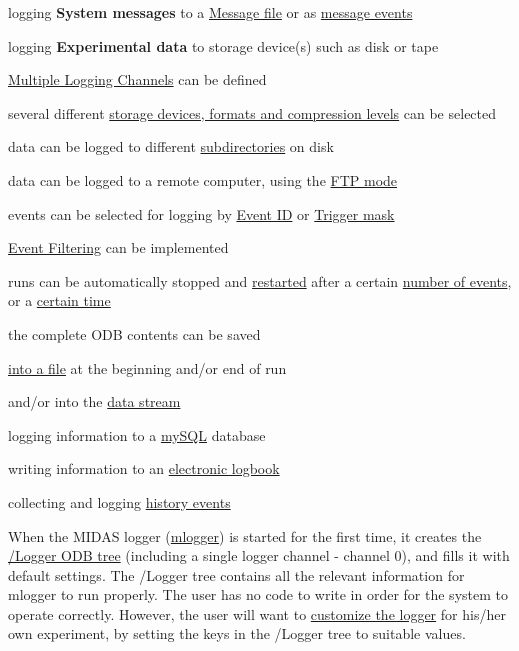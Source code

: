 \begin{DoxyItemize}
\item logging {\bfseries System messages} to a \hyperlink{F_Logging_Data_F_Logger_Message_File}{Message file} or as \hyperlink{F_Logging_Data_F_Logger_CS_Log_Messages}{message events} 
\item logging {\bfseries Experimental data } to storage device(s) such as disk or tape 
\begin{DoxyItemize}
\item \hyperlink{F_Logging_Data_F_Logger_multiple_logging_channels}{Multiple Logging Channels} can be defined 
\item several different \hyperlink{F_Logging_Data_F_Logger_CS_Filename}{storage devices, formats and compression levels} can be selected 
\item data can be logged to different \hyperlink{F_Logging_Data_F_Logger_CS_Subdir_Format}{subdirectories} on disk 
\item data can be logged to a remote computer, using the \hyperlink{F_Logging_Data_F_Logger_CS_Filename}{FTP mode} 
\item events can be selected for logging by \hyperlink{F_Logging_Data_F_Logger_CS_Event_ID}{Event ID} or \hyperlink{F_Logging_Data_F_Logger_CS_Trigger_Mask}{Trigger mask} 
\item \hyperlink{F_Logging_Data_F_Logger_Event_Filtering}{Event Filtering} can be implemented 
\item runs can be automatically stopped and \hyperlink{F_Logging_Data_F_Logger_Auto_Restart}{restarted} after a certain \hyperlink{FE_ODB_equipment_tree_FE_ODB_equipment_common}{number of events}, or a \hyperlink{F_Logging_Data_F_Logger_Run_Duration}{certain time} 
\item the complete ODB contents can be saved 
\begin{DoxyItemize}
\item \hyperlink{F_Logging_Data_F_Logger_ODB_Dump}{into a file} at the beginning and/or end of run 
\item and/or into the \hyperlink{F_Logging_Data_F_Logger_CS_ODB_Dump}{data stream} 
\end{DoxyItemize}
\end{DoxyItemize}
\item logging information to a \hyperlink{F_mySQL_F_Logger_mySQL}{mySQL} database 
\item writing information to an \hyperlink{F_Elog}{electronic logbook} 
\item collecting and logging \hyperlink{F_History_logging}{history events} 
\end{DoxyItemize} When the MIDAS logger (\hyperlink{F_Logging_F_mlogger_utility}{mlogger}) is started for the first time, it creates the \hyperlink{F_Logging_Data_F_Logger_tree}{/Logger ODB tree} (including a single logger channel -\/ channel 0), and fills it with default settings.  The /Logger tree contains all the relevant information for mlogger to run properly. The user has no code to write in order for the system to operate correctly. However, the user will want to \hyperlink{F_Logging_Data}{customize the logger} for his/her own experiment, by setting the keys in the /Logger tree to suitable values.

